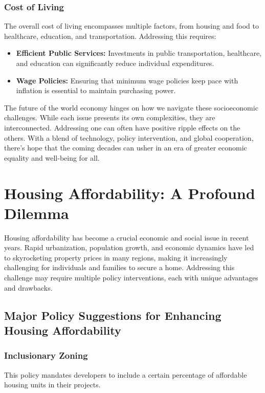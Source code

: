 \subsubsection*{Cost of Living}
The overall cost of living encompasses multiple factors, from housing and food to healthcare, education, and transportation. Addressing this requires:
\begin{itemize}
    \item \textbf{Efficient Public Services:} Investments in public transportation, healthcare, and education can significantly reduce individual expenditures.
    \item \textbf{Wage Policies:} Ensuring that minimum wage policies keep pace with inflation is essential to maintain purchasing power.
\end{itemize}

The future of the world economy hinges on how we navigate these socioeconomic challenges. While each issue presents its own complexities, they are interconnected. Addressing one can often have positive ripple effects on the others. With a blend of technology, policy intervention, and global cooperation, there's hope that the coming decades can usher in an era of greater economic equality and well-being for all.

\section*{Housing Affordability: A Profound Dilemma}

Housing affordability has become a crucial economic and social issue in recent years. Rapid urbanization, population growth, and economic dynamics have led to skyrocketing property prices in many regions, making it increasingly challenging for individuals and families to secure a home. Addressing this challenge may require multiple policy interventions, each with unique advantages and drawbacks.

\subsection*{Major Policy Suggestions for Enhancing Housing Affordability}

\subsubsection*{Inclusionary Zoning}
This policy mandates developers to include a certain percentage of affordable housing units in their projects.

